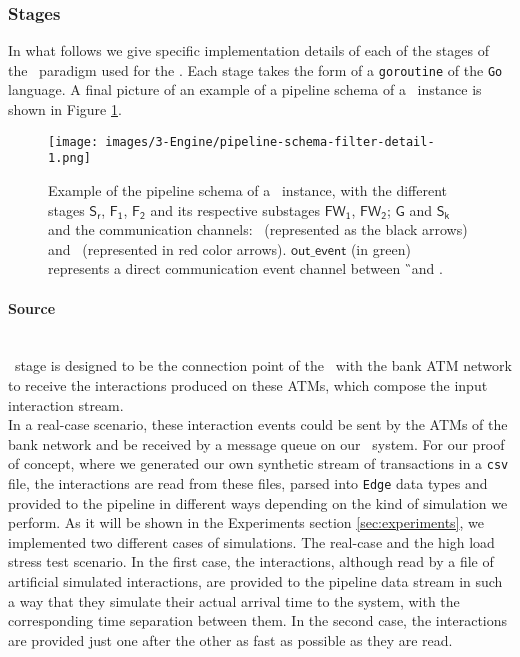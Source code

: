 \subsubsection*{Stages}
In what follows we give specific implementation details of each of the stages of the \DP\ paradigm used for the \DPATM. Each stage takes the form of a \texttt{goroutine} of the \texttt{Go} language. A final picture of an example of a pipeline schema of a \DPATM\ instance is shown in Figure \ref{img:pipeline-schema-1}.

\begin{figure}[H]
  \hspace*{-1.6cm}
  \centering
  \texttt{[image: images/3-Engine/pipeline-schema-filter-detail-1.png]}
  \caption{Example of the pipeline schema of a \DPATM\ instance, with the different stages $\mathsf{S_r}$, $\mathsf{F_1}$, $\mathsf{F_2}$ and its respective substages $\mathsf{FW_1}$, $\mathsf{FW_2}$; $\mathsf{G}$ and $\mathsf{S_k}$ and the communication channels: \eventch\ (represented as the black arrows) and \alertch\ (represented in red color arrows). $\mathsf{out\_event}$ (in green) represents a direct communication event channel between \G\ and \Sk.}
  \label{img:pipeline-schema-1}
\end{figure}

\paragraph*{Source\\\\}

\source\ stage is designed to be the connection point of the \DPATM\ with the bank ATM network to receive the interactions produced on these ATMs, which compose the input interaction stream.\\

In a real-case scenario, these interaction events could be sent by the ATMs of the bank network and be received by a message queue on our \DPATM\ system. For our proof of concept, where we generated our own synthetic stream of transactions in a \texttt{csv} file,
the interactions are read from these files, parsed into \texttt{Edge} data types and provided to the pipeline in different ways depending on the kind of simulation we perform. As it will be shown in the Experiments section \ref{sec:experiments}, we implemented two different cases of simulations. The real-case and the high load stress test scenario. In the first case, the interactions, although read by a file of artificial simulated interactions, are provided to the pipeline data stream in such a way that they simulate their actual arrival time to the system, with the corresponding time separation between them. In the second case, the interactions are provided just one after the other as fast as possible as they are read.\\

